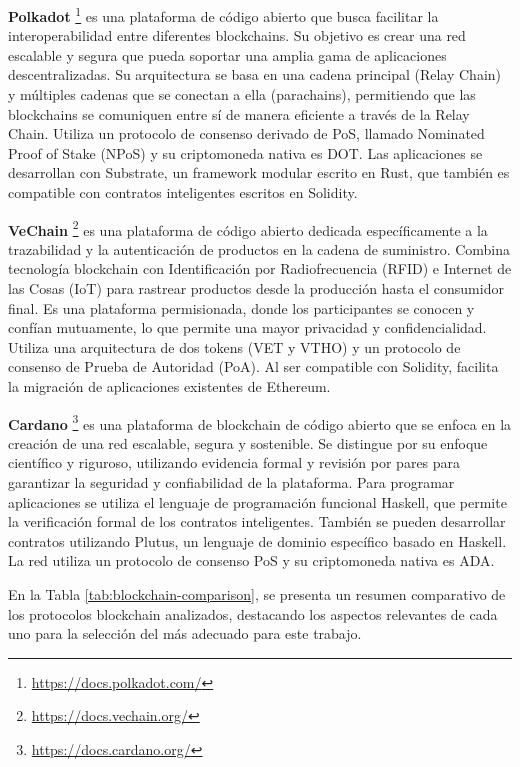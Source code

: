 \textbf{Polkadot} \footnote{\url{https://docs.polkadot.com/}}
es una plataforma de código abierto que busca facilitar la interoperabilidad entre diferentes blockchains. Su objetivo es crear una red escalable y segura que pueda soportar una amplia gama de aplicaciones descentralizadas. Su arquitectura se basa en una cadena principal (Relay Chain) y múltiples cadenas que se conectan a ella (parachains), permitiendo que las blockchains se comuniquen entre sí de manera eficiente a través de la Relay Chain. Utiliza un protocolo de consenso derivado de PoS, llamado Nominated Proof of Stake (NPoS) y su criptomoneda nativa es DOT. Las aplicaciones se desarrollan con Substrate, un framework modular escrito en Rust, que también es compatible con contratos inteligentes escritos en Solidity.

\textbf{VeChain} \footnote{\url{https://docs.vechain.org/}}
es una plataforma de código abierto dedicada específicamente a la trazabilidad y la autenticación de productos en la cadena de suministro. Combina tecnología blockchain con Identificación por Radiofrecuencia (RFID) e Internet de las Cosas (IoT) para rastrear productos desde la producción hasta el consumidor final. Es una plataforma permisionada, donde los participantes se conocen y confían mutuamente, lo que permite una mayor privacidad y confidencialidad. Utiliza una arquitectura de dos tokens (VET y VTHO) y un protocolo de consenso de Prueba de Autoridad (PoA). Al ser compatible con Solidity, facilita la migración de aplicaciones existentes de Ethereum.

\textbf{Cardano} \footnote{\url{https://docs.cardano.org/}}
es una plataforma de blockchain de código abierto que se enfoca en la creación de una red escalable, segura y sostenible. Se distingue por su enfoque científico y riguroso, utilizando evidencia formal y revisión por pares para garantizar la seguridad y confiabilidad de la plataforma. Para programar aplicaciones se utiliza el lenguaje de programación funcional Haskell, que permite la verificación formal de los contratos inteligentes. También se pueden desarrollar contratos utilizando Plutus, un lenguaje de dominio específico basado en Haskell. La red utiliza un protocolo de consenso PoS y su criptomoneda nativa es ADA.

En la Tabla \ref{tab:blockchain-comparison}, se presenta un resumen comparativo de los protocolos blockchain analizados, destacando los aspectos relevantes de cada uno para la selección del más adecuado para este trabajo.


